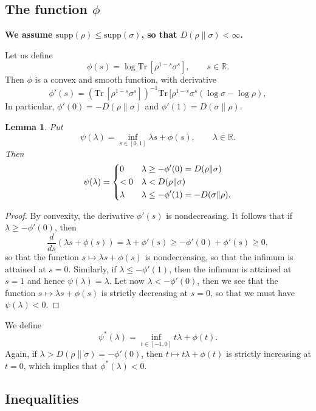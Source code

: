 \documentclass[12pt]{article}
\newtheorem{lemma}{Lemma}
\theoremstyle{definition}
\theoremstyle{remark}
\def \Tr{\mathrm{Tr}\,}
\def\supp{\mathrm{supp}}
\begin{document}
\subsection{The function $\phi$}

\textbf{We assume $\supp(\rho)\le \supp(\sigma)$, so that $D(\rho\|\sigma)<\infty$.}

Let us define 
\[
\phi(s)=\log \Tr[\rho^{1-s}\sigma^s],\qquad s\in \mathbb R.
\]
Then $\phi$ is a convex and smooth function, with derivative
\[
\phi'(s)=(\Tr[\rho^{1-s}\sigma^s])^{-1}\Tr[\rho^{1-s}\sigma^s(\log\sigma-\log\rho),
\]
\cite[Exercise 3.5]{hayashi2017quantum}
In particular,  $\phi'(0)=-D(\rho\|\sigma)$ and $\phi'(1)=D(\sigma\|\rho)$.

\begin{lemma}\label{lemma:phipsi}
Put
\[
\psi(\lambda)=\inf_{s\in[0,1]} \lambda s+\phi(s),\qquad \lambda\in \mathbb R.
\]
Then 
\[
\psi(\lambda)=\begin{dcases} 0 & \lambda\ge -\phi'(0)=D(\rho\|\sigma)\\
<0 & \lambda <D(\rho\|\sigma)\\
\lambda & \lambda \le -\phi'(1)=-D(\sigma\|\rho).
\end{dcases}
\]

\end{lemma}

\begin{proof} By convexity, the derivative $\phi'(s)$ is nondecreasing.  It follows that
if $\lambda\ge -\phi'(0)$, then 
\[
\frac{d}{ds} (\lambda s+\phi(s))=\lambda+\phi'(s)\ge -\phi'(0)+\phi'(s)\ge 0,
\]
so that the function $s\mapsto \lambda s+\phi(s)$ is nondecreasing, so that the infimum is
attained at $s=0$. Similarly, if $\lambda\le -\phi'(1)$, then the infimum is attained at
$s=1$ and hence $\psi(\lambda)=\lambda$. Let now $\lambda<-\phi'(0)$, then we see that
the function $s\mapsto \lambda s+\phi(s)$ is strictly decreasing at $s=0$, so that we must
have $\psi(\lambda)<0$.

\end{proof}

We define
\[
\psi^*(\lambda)=\inf_{t\in [-1,0]} t\lambda+\phi(t).
\]
Again, if $\lambda> D(\rho\|\sigma)=-\phi'(0)$, then $t\mapsto t\lambda +\phi(t)$ is
strictly increasing at $t=0$, which implies that $\phi^*(\lambda)<0$. 

\subsection{Inequalities}
\end{document}
